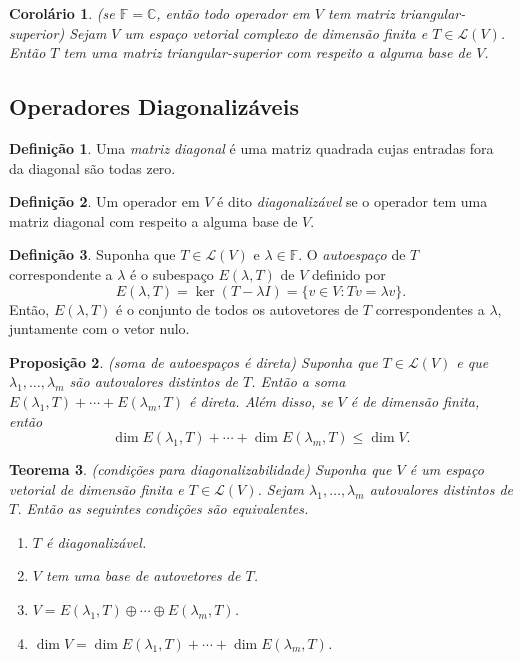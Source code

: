 \documentclass[12pt]{article}
\theoremstyle{plain}
\newtheorem{thm}{Teorema}[section]
\newtheorem{prop}[thm]{Proposição}
\newtheorem{cor}[thm]{Corolário}
\theoremstyle{definition}
\newtheorem{defn}{Definição}[section]
\theoremstyle{remark}
\begin{document}
\begin{cor} (se \(\mathbb{F}=\mathbb{C}\), então todo operador em \(V\) tem matriz triangular-superior)
    Sejam \(V\) um espaço vetorial complexo de dimensão finita e \(T \in \mathcal{L}(V)\). Então \(T\) tem uma matriz triangular-superior com respeito a alguma base de \(V\).
\end{cor}

\subsection{Operadores Diagonalizáveis}

\begin{defn}
    Uma \emph{matriz diagonal} é uma matriz quadrada cujas entradas fora da diagonal são todas zero.
\end{defn}

\begin{defn}
    Um operador em \(V\) é dito \emph{diagonalizável} se o operador tem uma matriz diagonal com respeito a alguma base de \(V\).
\end{defn}

\begin{defn}
    Suponha que \(T \in \mathcal{L}(V)\) e \(\lambda \in \mathbb{F}\). O \emph{autoespaço} de \(T\) correspondente a \(\lambda\) é o subespaço \(E(\lambda, T)\) de \(V\) definido por
    \[
        E(\lambda, T) = \ker(T - \lambda I) = \{v \in V : Tv = \lambda v\}.
    \]
    \noindent Então, \(E(\lambda, T)\) é o conjunto de todos os autovetores de \(T\) correspondentes a \(\lambda\), juntamente com o vetor nulo.
\end{defn}

\begin{prop} (soma de autoespaços é direta)
    Suponha que \(T \in \mathcal{L}(V)\) e que \(\lambda_1, \ldots, \lambda_m\) são autovalores distintos de \(T\). Então a soma \(E(\lambda_1, T) + \cdots + E(\lambda_m, T)\) é direta. Além disso, se \(V\) é de dimensão finita, então
    \[
        \dim E(\lambda_1, T) + \cdots + \dim E(\lambda_m, T) \leq \dim V.
    \]
\end{prop}

\begin{thm} (condições para diagonalizabilidade)
    Suponha que \(V\) é um espaço vetorial de dimensão finita e \(T \in \mathcal{L}(V)\). Sejam \(\lambda_1,\ldots,\lambda_m\) autovalores distintos de \(T\). Então as seguintes condições são equivalentes.
    \begin{enumerate}
        \item[\textup{(a)}] \(T\) é diagonalizável.
        \item[\textup{(b)}] \(V\) tem uma base de autovetores de \(T\).
        \item[\textup{(c)}] \(V = E(\lambda_1, T) \oplus \cdots \oplus E(\lambda_m, T)\).
        \item[\textup{(d)}] \(\dim V = \dim E(\lambda_1, T) + \cdots + \dim E(\lambda_m, T)\).
    \end{enumerate}
\end{thm}
\end{document}
